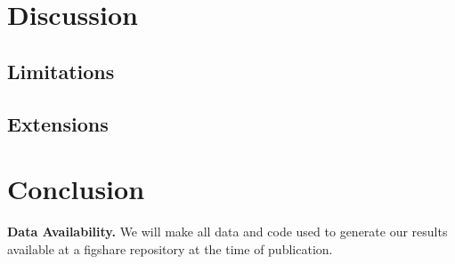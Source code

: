 \documentclass[12pt]{article}
\begin{document}
\section{Discussion}


\subsection{Limitations}


\subsection{Extensions}


\section{Conclusion}


\bigskip
\noindent\textbf{Data Availability.} We will make all data and code used to generate our results available at a figshare repository at the time of publication.
\end{document}
